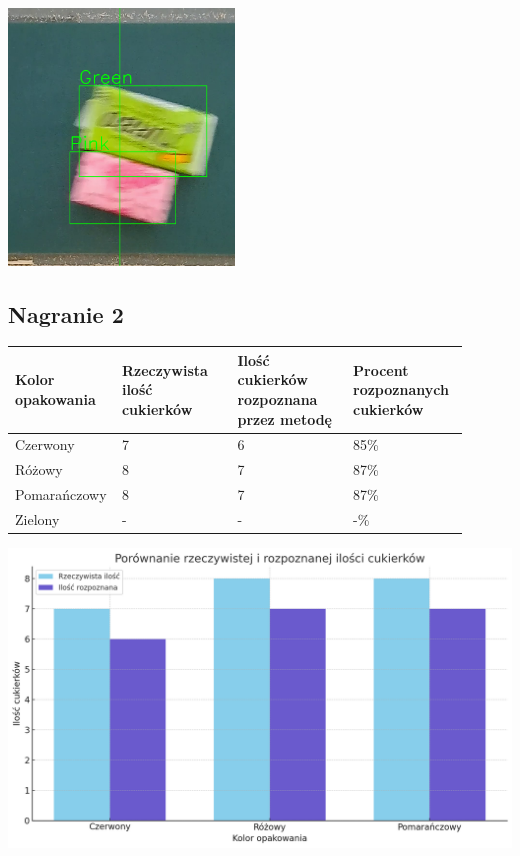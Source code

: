 \documentclass{article}
\begin{document}
\begin{center}
\includegraphics[width=6cm]{badanie.png}
\end{center}

\subsection{Nagranie 2}


\begin{center}
\begin{tabular}{|p{0.15\linewidth}|p{0.25\linewidth}|p{0.25\linewidth}|p{0.25\linewidth}|}
 \hline
 Kolor opakowania & Rzeczywista ilość cukierków & Ilość cukierków rozpoznana przez metodę & Procent rozpoznanych cukierków \\
 \hline
 Czerwony & 7 & 6 & 85\% \\
 \hline
 Różowy & 8 & 7 & 87\% \\
 \hline
 Pomarańczowy & 8 & 7 & 87\% \\
 \hline
 Zielony & - & - & -\% \\
 \hline
\end{tabular}
\end{center}

\begin{center}
\includegraphics[width=\linewidth]{wykres2.png}
\end{center}
\end{document}

